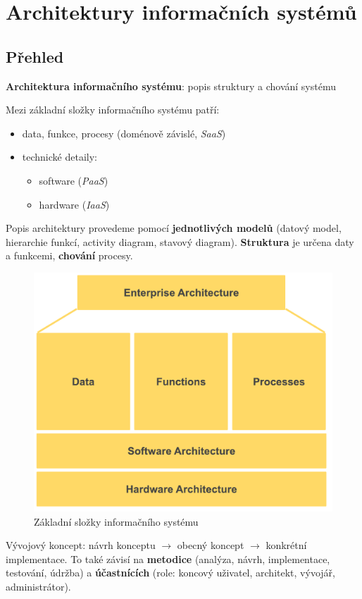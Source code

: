 \section{Architektury informačních systémů}

\subsection{Přehled}

\textbf{Architektura informačního systému}: popis struktury a chování systému

\vspace{4pt}
\noindent Mezi základní složky informačního systému patří:
\begin{itemize}
    \item data, funkce, procesy (do\-ménově závislé, \textit{SaaS})
    \item technické detaily:
    \begin{itemize}
        \item software (\textit{PaaS})
        \item hardware (\textit{IaaS})
    \end{itemize}
\end{itemize}

\noindent Popis architektury provedeme pomocí \textbf{jednotlivých modelů} (datový model, hierarchie funkcí, activity diagram, stavový diagram). \textbf{Struktura} je určena daty a funkcemi, \textbf{chování} procesy.

\begin{figure}[H]
    \centering
    \includegraphics[width=.7\textwidth]{fig/02-architectures}
    \caption{Základní složky informačního systému}
\end{figure}

Vývojový koncept: návrh konceptu $\to$ obecný koncept $\to$ konkrétní implementace. To také závisí na \textbf{metodice} (analýza, návrh, implementace, testování, údržba) a \textbf{účastnících} (role: koncový uživatel, architekt, vývojář, administrátor).

